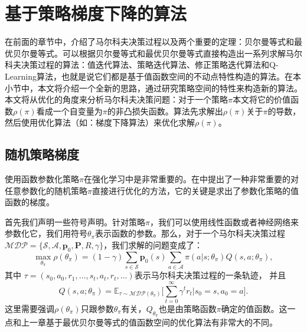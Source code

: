 \section{基于策略梯度下降的算法}

在前面的章节中，介绍了马尔科夫决策过程以及两个重要的定理：贝尔曼等式和最优贝尔曼等式。可以根据贝尔曼等式和最优贝尔曼等式直接构造出一系列求解马尔科夫决策过程的算法：值迭代算法、策略迭代算法、修正策略迭代算法和Q-Learning算法，也就是说它们都是基于值函数空间的不动点特性构造的算法。在本小节中，本文将介绍一个全新的思路，通过研究策略空间的特性来构造新的算法。本文将从优化的角度来分析马尔科夫决策问题：对于一个策略$\pi$本文将它的价值函数$\rho(\pi)$看成一个自变量为$\pi$的非凸损失函数。算法先求解出$\rho(\pi)$关于$\pi$的导数，然后使用优化算法（如：梯度下降算法）来优化求解$\rho(\pi)$。

\subsection{随机策略梯度}\label{ss:policy-gradient}
使用函数参数化策略$\pi$在强化学习中是非常重要的。在\cite{sutton1999policy,sutton2018reinforcement}中提出了一种非常重要的对任意参数化的随机策略$\pi$直接进行优化的方法，它的关键是求出了参数化策略的值函数的梯度。

首先我们声明一些符号声明。针对策略$\pi$，我们可以使用线性函数或者神经网络来参数化它，我们用符号$\theta_\pi$表示函数的参数。那么，对于一个马尔科夫决策过程$\mathcal{MDP} = \{\mathcal{S}, \mathcal{A},\mathbf{p}_0, \mathbf{P}, R, \gamma\}$，我们求解的问题变成了：
\begin{equation}
    \max_{\theta_\pi} \rho(\theta_\pi) = 
    (1 - \gamma) \sum_{s \in \mathcal{S}} \mathbf{p}_0(s) 
    \sum_{a \in \mathcal{A}} \pi(a \vert s; \theta_\pi) Q(s, a; \theta_\pi),
\end{equation}
其中 $\tau = (s_0, a_0, r_1, \ldots, s_t, a_t, r_t, \ldots)$表示马尔科夫决策过程的一条轨迹，
并且
\begin{equation}
    Q(s, a; \theta_\pi) = \mathbb{E}_{\tau \sim \mathcal{MDP}(\theta_\pi)}
    \bigg[
        \sum^{\infty}_{t = 0} \gamma^t r_t \bigg\vert s_0 = s, a_0 = a
    \bigg].
\end{equation}
这里需要强调$\rho(\theta_\pi)$只跟参数$\theta_\pi$有关，$Q_{\theta_\pi}$也是由策略函数$\pi$确定的值函数。这一点和上一章基于最优贝尔曼等式的值函数空间的优化算法有非常大的不同。

